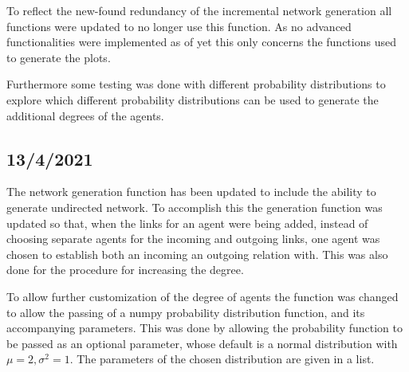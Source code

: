 \documentclass{article}
\begin{document}
To reflect the new-found redundancy of the incremental network generation all functions were updated to no longer use this function. As no advanced functionalities were implemented as of yet this only concerns the functions used to generate the plots.

Furthermore some testing was done with different probability distributions to explore which different probability distributions can be used to generate the additional degrees of the agents.

\newpage

\subsection{13/4/2021}
The network generation function has been updated to include the ability to generate undirected network. To accomplish this the generation function was updated so that, when the links for an agent were being added, instead of choosing separate agents for the incoming and outgoing links, one agent was chosen to establish both an incoming an outgoing relation with. This was also done for the procedure for increasing the degree.

To allow further customization of the degree of agents the function was changed to allow the passing of a numpy probability distribution function, and its accompanying parameters. This was done by allowing the probability function to be passed as an optional parameter, whose default is a normal distribution with $\mu=2, \sigma^2=1$. The parameters of the chosen distribution are given in a list.
\end{document}
